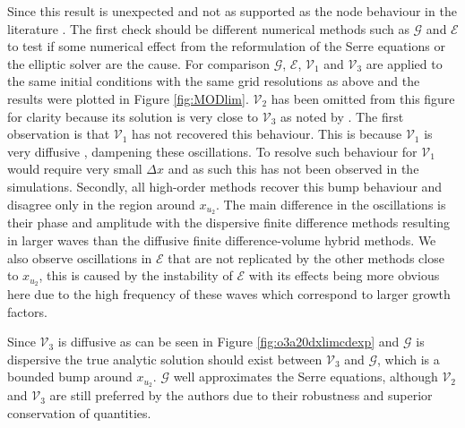 \documentclass[SingleSpace,12pt,Journal]{Serre_ASCE}
\begin{document}
Since this result is unexpected and not as supported as the node behaviour in the literature \cite{El-etal-2006}. The first check should be different numerical methods such as $\mathcal{G}$ and $\mathcal{E}$ to test if some numerical effect from the reformulation of the Serre equations or the elliptic solver are the cause. For comparison $\mathcal{G}$, $\mathcal{E}$, $\mathcal{V}_1$ and $\mathcal{V}_3$ are applied to the same initial conditions with the same grid resolutions as above and the results were plotted in Figure \ref{fig:MODlim}. $\mathcal{V}_2$ has been omitted from this figure for clarity because its solution is very close to $\mathcal{V}_3$ as noted by . The first observation is that $\mathcal{V}_1$ has not recovered this behaviour. This is because $\mathcal{V}_1$ is very diffusive \cite{Zoppou-etal-2017}, dampening these oscillations. To resolve such behaviour for $\mathcal{V}_1$ would require very small $\Delta x$ and as such this has not been observed in the simulations. Secondly, all high-order methods recover this bump behaviour and disagree only in the region around $x_{u_2}$. The main difference in the oscillations is their phase and amplitude with the dispersive finite difference methods resulting in larger waves than the diffusive finite difference-volume hybrid methods. We also observe oscillations in $\mathcal{E}$ that are not replicated by the other methods close to $x_{u_2}$, this is caused by the instability of $\mathcal{E}$ with its effects being more obvious here due to the high frequency of these waves which correspond to larger growth factors. 

Since $\mathcal{V}_3$ is diffusive as can be seen in Figure \ref{fig:o3a20dxlimcdexp} and $\mathcal{G}$ is dispersive the true analytic solution should exist between $\mathcal{V}_3$ and $\mathcal{G}$, which is a bounded bump around $x_{u_2}$. $\mathcal{G}$ well approximates the Serre equations, although $\mathcal{V}_2$ and $\mathcal{V}_3$ are still preferred by the authors due to their robustness and superior conservation of quantities. 
\end{document}
